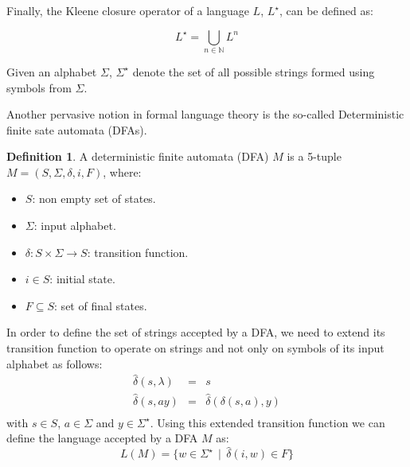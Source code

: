 \documentclass[oneside,12pt]{scrbook}
\theoremstyle{definition}
\theoremstyle{plain}
\theoremstyle{definition}
\newtheorem{Definition}{Definition}
\begin{document}
Finally, the Kleene closure operator of a language $L$, $L^\star$, can be defined as:

\begin{equation*}
L^{\star} = \bigcup_{n\in \mathbb{N}}L^{n}
\end{equation*}

Given an alphabet $\Sigma$, $\Sigma^\star$ denote the set of all possible strings
formed using symbols from $\Sigma$.

Another pervasive notion in formal language theory is the so-called 
Deterministic finite sate automata (DFAs).
\begin{Definition}
    A deterministic finite automata (DFA) $M$ is a 5-tuple $M=(S,\Sigma,\delta,i,F)$, where:
    \begin{itemize}
        \item $S$: non empty set of states.
        \item $\Sigma$: input alphabet.
        \item $\delta : S \times \Sigma \to S$: transition function.
        \item $i \in S$: initial state.
        \item $F \subseteq S$: set of final states.
    \end{itemize}
\end{Definition}

In order to define the set of strings accepted by a DFA, we need to extend its transition function to
operate on strings and not only on symbols of its input alphabet as follows:
\begin{equation*}
  \begin{array}{lcl}
    \widehat{\delta}(s,\lambda) & = & s \\
    \widehat{\delta}(s,ay)      & = & \widehat{\delta}(\delta(s,a),y)\\
  \end{array}
\end{equation*}
with $s \in S$, $a \in \Sigma$ and $y \in \Sigma^\star$. Using this extended transition function we can
define the language accepted by a DFA $M$ as:
\begin{equation*}
  L(M) = \{w \in \Sigma^\star\,\mid\, \widehat{\delta}(i,w) \in F\}
\end{equation*}
\end{document}
